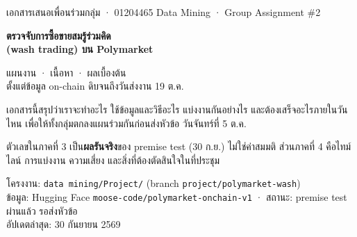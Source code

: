 \documentclass[11pt,a4paper]{article}
\newcommand{\sansall}{\sffamily}
\newcommand{\code}[1]{\texttt{#1}}
\begin{document}
\begin{titlepage}
\thispagestyle{empty}

\vspace*{1.2cm}
{\sansall\color{muted}\small เอกสารเสนอเพื่อนร่วมกลุ่ม · 01204465 Data Mining · Group Assignment \#2}

\vspace{0.9cm}
{\sansall\bfseries\fontsize{25}{34}\selectfont\color{accent!90!black}
ตรวจจับการซื้อขายสมรู้ร่วมคิด\\(wash trading) บน Polymarket\par}

\vspace{0.5cm}
{\sansall\fontsize{13.5}{20}\selectfont\color{ink}
แผนงาน · เนื้อหา · ผลเบื้องต้น\\
ตั้งแต่ข้อมูล on-chain ดิบจนถึงวันส่งงาน 19 ต.ค.\par}

\vspace{2.6cm}

\begin{minipage}{0.66\textwidth}
เอกสารนี้สรุปว่าเราจะทำอะไร ใช้ข้อมูลและวิธีอะไร แบ่งงานกันอย่างไร
และต้องเสร็จอะไรภายในวันไหน เพื่อให้ทั้งกลุ่มตกลงแผนร่วมกันก่อนส่งหัวข้อ
วันจันทร์ที่ 5 ต.ค.

\vspace{0.6em}
ตัวเลขในภาคที่ 3 เป็น\textbf{ผลรันจริง}ของ premise test (30 ก.ย.) ไม่ใช่ค่าสมมติ
ส่วนภาคที่ 4 คือไทม์ไลน์ การแบ่งงาน ความเสี่ยง และสิ่งที่ต้องตัดสินใจในที่ประชุม
\end{minipage}

\vfill
{}
\vspace{0.3em}

{\sansall\footnotesize\color{muted}
โครงงาน: \code{data mining/Project/} (branch \code{project/polymarket-wash}) \\
ข้อมูล: Hugging Face \code{moose-code/polymarket-onchain-v1} · สถานะ: premise test ผ่านแล้ว รอส่งหัวข้อ \\
อัปเดตล่าสุด: 30 กันยายน 2569}
\end{titlepage}
\end{document}
